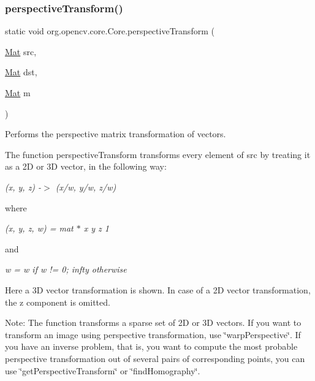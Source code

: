 \subsubsection{\texorpdfstring{perspective\+Transform()}{perspectiveTransform()}}
{\footnotesize\ttfamily static void org.\+opencv.\+core.\+Core.\+perspective\+Transform (\begin{DoxyParamCaption}\item[{\mbox{\hyperlink{classorg_1_1opencv_1_1core_1_1_mat}{Mat}}}]{src,  }\item[{\mbox{\hyperlink{classorg_1_1opencv_1_1core_1_1_mat}{Mat}}}]{dst,  }\item[{\mbox{\hyperlink{classorg_1_1opencv_1_1core_1_1_mat}{Mat}}}]{m }\end{DoxyParamCaption})\hspace{0.3cm}{\ttfamily [static]}}

Performs the perspective matrix transformation of vectors.

The function {\ttfamily perspective\+Transform} transforms every element of {\ttfamily src} by treating it as a 2D or 3D vector, in the following way\+:

{\itshape (x, y, z) -\/$>$ (x\textquotesingle{}/w, y\textquotesingle{}/w, z\textquotesingle{}/w)}

where

{\itshape (x\textquotesingle{}, y\textquotesingle{}, z\textquotesingle{}, w\textquotesingle{}) = mat $\ast$ x y z 1 }

and

{\itshape w = w\textquotesingle{} if w\textquotesingle{} != 0; infty otherwise}

Here a 3D vector transformation is shown. In case of a 2D vector transformation, the {\ttfamily z} component is omitted.

Note\+: The function transforms a sparse set of 2D or 3D vectors. If you want to transform an image using perspective transformation, use \char`\"{}warp\+Perspective\char`\"{}. If you have an inverse problem, that is, you want to compute the most probable perspective transformation out of several pairs of corresponding points, you can use \char`\"{}get\+Perspective\+Transform\char`\"{} or \char`\"{}find\+Homography\char`\"{}.


